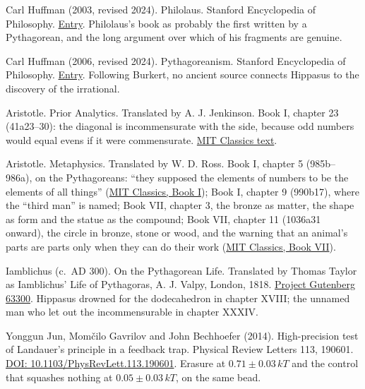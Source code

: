 \documentclass[11pt,twoside]{article}
\theoremstyle{thielethm}
\theoremstyle{thieledef}
\theoremstyle{thieledef}
\theoremstyle{thieledef}
\theoremstyle{thielethm}
\theoremstyle{thieleobs}
\theoremstyle{thielethm}
\begin{document}
\noindent Carl Huffman (2003, revised 2024). Philolaus. Stanford Encyclopedia of Philosophy. \href{https://plato.stanford.edu/entries/philolaus/}{Entry}. Philolaus's book as probably the first written by a Pythagorean, and the long argument over which of his fragments are genuine.
\par\medskip

\noindent Carl Huffman (2006, revised 2024). Pythagoreanism. Stanford Encyclopedia of Philosophy. \href{https://plato.stanford.edu/entries/pythagoreanism/}{Entry}. Following Burkert, no ancient source connects Hippasus to the discovery of the irrational.
\par\medskip

\noindent Aristotle. Prior Analytics. Translated by A. J. Jenkinson. Book I, chapter 23 (41a23--30): the diagonal is incommensurate with the side, because odd numbers would equal evens if it were commensurate. \href{http://classics.mit.edu/Aristotle/prior.mb.txt}{MIT Classics text}.
\par\medskip

\noindent Aristotle. Metaphysics. Translated by W. D. Ross. Book I, chapter 5 (985b--986a), on the Pythagoreans: ``they supposed the elements of numbers to be the elements of all things'' (\href{http://classics.mit.edu/Aristotle/metaphysics.1.i.html}{MIT Classics, Book I}); Book I, chapter 9 (990b17), where the ``third man'' is named; Book VII, chapter 3, the bronze as matter, the shape as form and the statue as the compound; Book VII, chapter 11 (1036a31 onward), the circle in bronze, stone or wood, and the warning that an animal's parts are parts only when they can do their work (\href{http://classics.mit.edu/Aristotle/metaphysics.7.vii.html}{MIT Classics, Book VII}).
\par\medskip

\noindent Iamblichus (c.\ AD 300). On the Pythagorean Life. Translated by Thomas Taylor as Iamblichus' Life of Pythagoras, A. J. Valpy, London, 1818. \href{https://www.gutenberg.org/ebooks/63300}{Project Gutenberg 63300}. Hippasus drowned for the dodecahedron in chapter XVIII; the unnamed man who let out the incommensurable in chapter XXXIV.
\par\medskip

\noindent Yonggun Jun, Mom\v{c}ilo Gavrilov and John Bechhoefer (2014). High-precision test of Landauer's principle in a feedback trap. Physical Review Letters 113, 190601. \href{https://doi.org/10.1103/PhysRevLett.113.190601}{DOI: 10.1103/PhysRevLett.113.190601}. Erasure at $0.71 \pm 0.03\,kT$ and the control that squashes nothing at $0.05 \pm 0.03\,kT$, on the same bead.
\par\medskip
\end{document}
